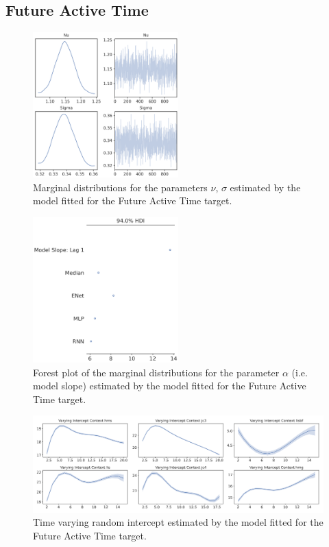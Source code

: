 \subsection{Future Active Time}
\label{future_abs_bayes_2}

\begin{figure}[H]
\centering
\includegraphics[width=0.5\textwidth]{images/appendix_C/Future Active Time_marginals_2.png}
\caption[\textbf{Future active time marginal distributions}]{Marginal distributions for the parameters $\nu$, $\sigma$ estimated by the model fitted for the Future Active Time target.}
\label{marginals_act_2}
\end{figure}

\begin{figure}[H]
\centering
\includegraphics[width=0.5\textwidth]{images/appendix_C/Future Active Time_models_2.png}
\caption[\textbf{Future active time model fixed effect}]{Forest plot of the marginal distributions for the parameter $\alpha$ (i.e. model slope) estimated by the model fitted for the Future Active Time target.}
\label{model_act_2}
\end{figure}

\begin{figure}[H]
\centering
\includegraphics[width=\textwidth]{images/appendix_C/Future Active Time_interc_2.png}
\caption[\textbf{Future active time time-varying random intercept}]{Time varying random intercept estimated by the model fitted for the Future Active Time target.}
\label{interc_act_2}
\end{figure}

